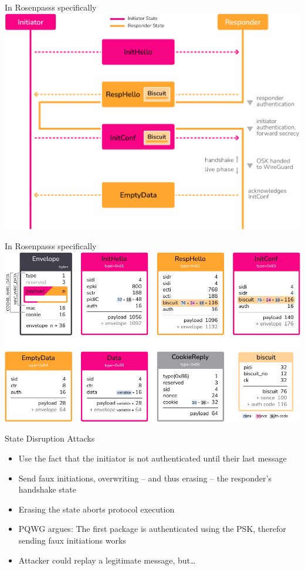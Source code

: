 \begin{frame}{In Rosenpasss specifically}
  \includegraphics[height=.80\textheight]{graphics/rosenpass-wp-key-exchange-protocol-rgb.pdf}
\end{frame}

\begin{frame}{In Rosenpasss specifically}
  \includegraphics[height=.80\textheight]{graphics/rosenpass-wp-message-types-rgb.pdf}
\end{frame}

\begin{frame}{State Disruption Attacks}
\begin{itemize}
  \item Use the fact that the initiator is not authenticated until their last message
  \item Send faux initiations, overwriting – and thus erasing – the responder's handshake state
  \item Erasing the state aborts protocol execution
  \item PQWG argues: The first package is authenticated using the PSK, therefor sending faux initiations works
  \item Attacker could replay a legitimate message, but…
\end{itemize}
\end{frame}

